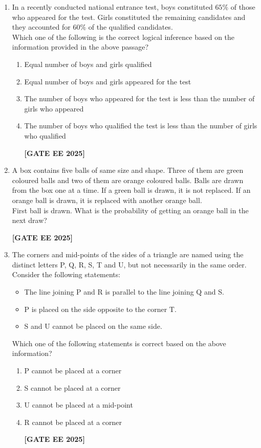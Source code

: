 \documentclass[journal]{IEEEtran}
\newcommand{\qfooter}{%
  \begin{flushright}\footnotesize\textbf{[GATE EE 2025]}\end{flushright}\vspace{1em}%
}
\begin{document}
\begin{enumerate}
\item In a recently conducted national entrance test, boys constituted $65\%$ of those who appeared for the test. Girls constituted the remaining candidates and they accounted for $60\%$ of the qualified candidates.\\
Which one of the following is the correct logical inference based on the information provided in the above passage?
\begin{enumerate}
\item Equal number of boys and girls qualified
\item Equal number of boys and girls appeared for the test
\item The number of boys who appeared for the test is less than the number of girls who appeared
\item The number of boys who qualified the test is less than the number of girls who qualified
\qfooter
\end{enumerate}

\item A box contains five balls of same size and shape. Three of them are green coloured balls and two of them are orange coloured balls. Balls are drawn from the box one at a time. If a green ball is drawn, it is not replaced. If an orange ball is drawn, it is replaced with another orange ball.\\
First ball is drawn. What is the probability of getting an orange ball in the next draw?
\begin{enumerate}
\qfooter
\end{enumerate}

\item The corners and mid-points of the sides of a triangle are named using the distinct letters P, Q, R, S, T and U, but not necessarily in the same order.\\
Consider the following statements:
\begin{itemize}
    \item The line joining P and R is parallel to the line joining Q and S.
    \item P is placed on the side opposite to the corner T.
    \item S and U cannot be placed on the same side.
\end{itemize}
Which one of the following statements is correct based on the above information?
\begin{enumerate}
\item P cannot be placed at a corner
\item S cannot be placed at a corner
\item U cannot be placed at a mid-point
\item R cannot be placed at a corner
\qfooter
\end{enumerate}


\end{enumerate}
\end{document}
